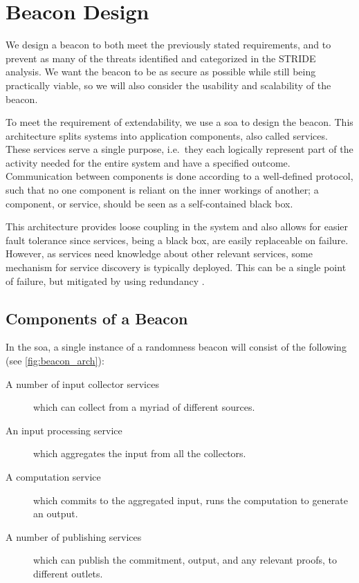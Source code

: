 \section{Beacon Design}


We design a beacon to both meet the previously stated requirements, and to prevent as many of the threats identified and categorized in the STRIDE analysis. We want the beacon to be as secure as possible while still being practically viable, so we will also consider the usability and scalability of the beacon.

To meet the requirement of extendability, we use a \gls{soa} to design the beacon.
This architecture splits systems into application components, also called services.
These services serve a single purpose, i.e.\ they each logically represent part of the activity needed for the entire system and have a specified outcome.
Communication between components is done according to a well-defined protocol, such that no one component is reliant on the inner workings of another;
a component, or service, should be seen as a self-contained black box.

This architecture provides loose coupling in the system and also allows for easier fault tolerance since services, being a black box, are easily replaceable on failure.
However, as services need knowledge about other relevant services, some mechanism for service discovery is typically deployed.
This can be a single point of failure, but mitigated by using redundancy \cite{soa_redundancy}.

\subsection{Components of a Beacon}
\label{sub:components_of_a_beacon}
In the \gls{soa}, a single instance of a randomness beacon will consist of the following (see \cref{fig:beacon_arch}):
\begin{description}
    \item[A number of input collector services] which can collect from a myriad of different sources.
    \item[An input processing service] which aggregates the input from all the collectors.
    \item[A computation service] which commits to the aggregated input, runs the computation to generate an output.
    \item[A number of publishing services] which can publish the commitment, output, and any relevant proofs, to different outlets.
\end{description}

